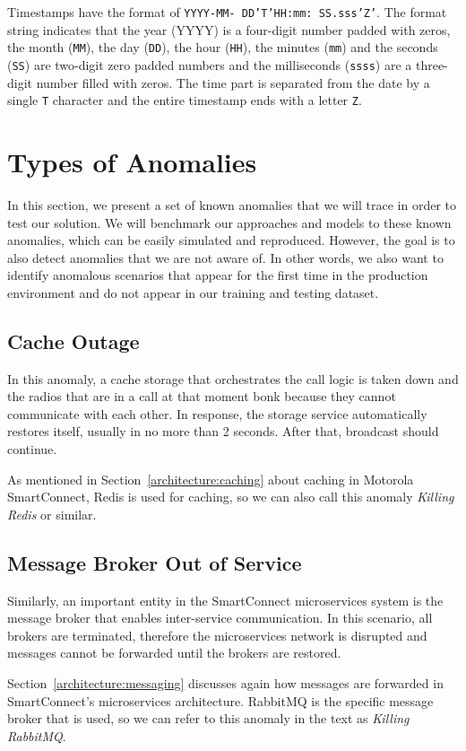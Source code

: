 Timestamps have the format of \texttt{YYYY-MM- DD'T'HH:mm: SS.sss'Z'}. The format string indicates that the year (YYYY) is a four-digit number padded with zeros, the month (\texttt{MM}), the day (\texttt{DD}), the hour (\texttt{HH}), the minutes (\texttt{mm}) and the seconds (\texttt{SS}) are two-digit zero padded numbers and the milliseconds (\texttt{ssss}) are a three-digit number filled with zeros. The time part is separated from the date by a single \texttt{T} character and the entire timestamp ends with a letter \texttt{Z}.

\section{Types of Anomalies}
\label{anomaly_types}
In this section, we present a set of known anomalies that we will trace in order to test our solution.
We will benchmark our approaches and models to these known anomalies, which can be easily simulated and reproduced. 
However, the goal is to also detect anomalies that we are not aware of.
In other words, we also want to identify anomalous scenarios that appear for the first time in the production environment and do not appear in our training and testing dataset.

\subsection{Cache Outage}
In this anomaly, a cache storage that orchestrates the call logic is taken down and the radios that are in a call at that moment bonk because they cannot communicate with each other.
In response, the storage service automatically restores itself, usually in no more than 2 seconds. After that, broadcast should continue.

As mentioned in Section~\ref{architecture:caching} about caching in Motorola SmartConnect, Redis is used for caching, so we can also call this anomaly \textit{Killing Redis} or similar.

\subsection{Message Broker Out of Service}
Similarly, an important entity in the SmartConnect microservices system is the message broker that enables inter-service communication. In this scenario, all brokers are terminated, therefore the microservices network is disrupted and messages cannot be forwarded until the brokers are restored.

Section~\ref{architecture:messaging} discusses again how messages are forwarded in SmartConnect's microservices architecture. RabbitMQ is the specific message broker that is used, so we can refer to this anomaly in the text as \textit{Killing RabbitMQ}.

